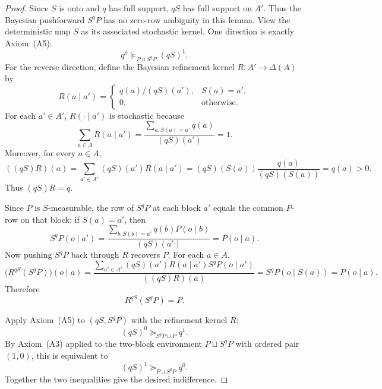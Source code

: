 \documentclass[11pt,a4paper]{article}
\theoremstyle{definition}
\newcommand{\1}{\mathbf 1}
\begin{document}
\begin{proof}
Since $S$ is onto and $q$ has full support, $qS$ has full support on $A'$.  Thus the Bayesian pushforward $S^qP$ has no
zero-row ambiguity in this lemma.  View the deterministic map $S$ as its associated stochastic kernel.
One direction is exactly Axiom~\textup{(A5)}:
\[
q^0\succeq_{P\sqcup S^qP}(qS)^1.
\]
For the reverse direction, define the Bayesian refinement kernel $R:A'\to\Delta(A)$ by
\[
R(a\mid a')=
\begin{cases}
q(a)/(qS)(a'),&S(a)=a',\\
0,&\text{otherwise}.
\end{cases}
\]
For each $a'\in A'$, $R(\cdot\mid a')$ is stochastic because
\[
\sum_{a\in A}R(a\mid a')
=
\frac{\sum_{a:S(a)=a'}q(a)}{(qS)(a')}
=1.
\]
Moreover, for every $a\in A$,
\[
((qS)R)(a)
=
\sum_{a'\in A'}(qS)(a')R(a\mid a')
=
(qS)(S(a))\frac{q(a)}{(qS)(S(a))}
=q(a)>0.
\]
Thus $(qS)R=q$.

Since $P$ is $S$-measurable, the row of $S^qP$ at each block $a'$ equals the common $P$-row on that block: if $S(a)=a'$,
then
\[
S^qP(o\mid a')
=
\frac{\sum_{b:S(b)=a'}q(b)P(o\mid b)}{(qS)(a')}
=
P(o\mid a).
\]
Now pushing $S^qP$ back through $R$ recovers $P$.  For each $a\in A$,
\[
\bigl(R^{qS}(S^qP)\bigr)(o\mid a)
=
\frac{\sum_{a'\in A'}(qS)(a')R(a\mid a')S^qP(o\mid a')}{((qS)R)(a)}
=
S^qP(o\mid S(a))
=
P(o\mid a).
\]
Therefore
\[
R^{qS}(S^qP)=P.
\]

Apply Axiom~\textup{(A5)} to $(qS,S^qP)$ with the refinement kernel $R$:
\[
(qS)^0\succeq_{S^qP\sqcup P}q^1.
\]
By Axiom~\textup{(A3)} applied to the two-block environment $P\sqcup S^qP$ with ordered pair $(1,0)$, this is equivalent
to
\[
(qS)^1\succeq_{P\sqcup S^qP}q^0.
\]
Together the two inequalities give the desired indifference.
\end{proof}
\end{document}
